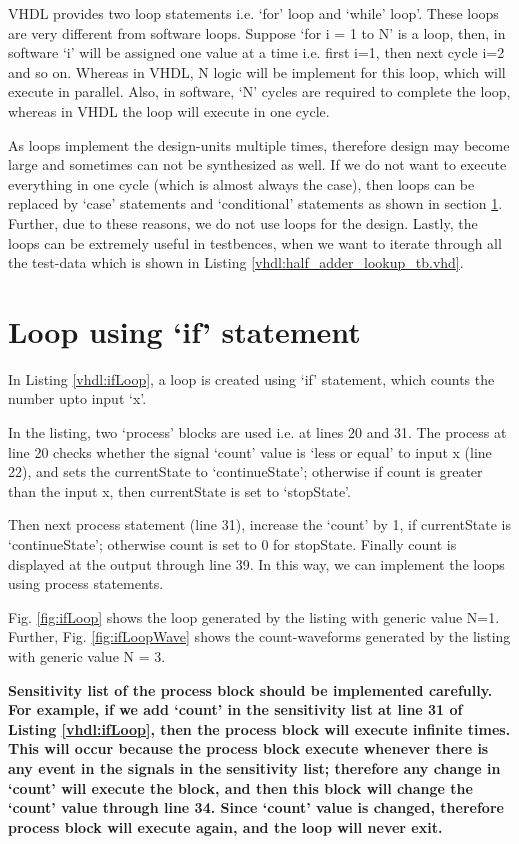 VHDL provides two loop statements i.e. `for' loop and `while' loop'. These loops are very different from software loops. Suppose `for i = 1 to N' is a loop, then, in software `i' will be assigned one value at a time i.e. first i=1, then next cycle i=2 and so on. Whereas in VHDL, N logic will be implement for this loop, which will execute in parallel. Also, in software, `N' cycles are required to complete the loop, whereas in VHDL the loop will execute in one cycle. 
\begin{noNumBox}
	As loops implement the design-units multiple times, therefore design may become large and sometimes can not be synthesized as well. If we do not want to execute everything in one cycle (which is almost always the case), then loops can be replaced by `case' statements and `conditional' statements as shown in section \ref{sec:ifLoop}. Further, due to these reasons, we do not use loops for the design. Lastly, the loops can be extremely useful in testbences, when we want to iterate through all the test-data which is shown in Listing \ref{vhdl:half_adder_lookup_tb.vhd}.  
\end{noNumBox}   

\section{Loop using `if' statement}\label{sec:ifLoop}
In Listing \ref{vhdl:ifLoop}, a loop is created using `if' statement, which counts the number upto input `x'. 

\begin{explanation}
	In the listing, two `process' blocks are used i.e. at lines 20 and 31. The process at line 20 checks whether the signal `count' value is `less or equal' to input x (line 22), and sets the currentState to `continueState'; otherwise if count is greater than the input x, then currentState is set to `stopState'.
	
	Then next process statement (line 31), increase the `count' by 1, if currentState is `continueState'; otherwise count is set to 0 for stopState. Finally count is displayed at the output through line 39. In this way, we can implement the loops using process statements. 
	
	Fig. \ref{fig:ifLoop} shows the loop generated by the listing with generic value N=1. Further,  Fig. \ref{fig:ifLoopWave} shows the count-waveforms generated by the listing with generic value N = 3.
	
	\textbf{Sensitivity list of the process block should be implemented carefully. For example, if we add `count' in the sensitivity list at line 31 of Listing  \ref{vhdl:ifLoop}, then the process block will execute infinite times. This will occur because the process block execute whenever there is any event in the signals in the sensitivity list; therefore any change in `count' will execute the block, and then this block will change the `count' value through line 34. Since `count' value is changed, therefore process block will execute again, and the loop will never exit.}
	
\end{explanation}


